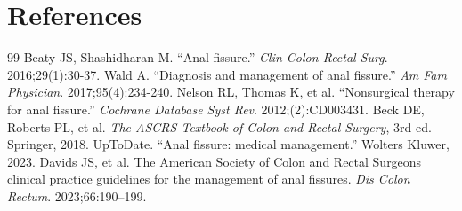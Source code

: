 \section*{References}
\begin{thebibliography}{99}
 Beaty JS, Shashidharan M. ``Anal fissure.'' \textit{Clin Colon Rectal Surg}. 2016;29(1):30-37.
 Wald A. ``Diagnosis and management of anal fissure.'' \textit{Am Fam Physician}. 2017;95(4):234-240.
 Nelson RL, Thomas K, et al. ``Nonsurgical therapy for anal fissure.'' \textit{Cochrane Database Syst Rev}. 2012;(2):CD003431.
 Beck DE, Roberts PL, et al. \textit{The ASCRS Textbook of Colon and Rectal Surgery}, 3rd ed. Springer, 2018.
 UpToDate. ``Anal fissure: medical management.'' Wolters Kluwer, 2023.
 Davids JS, et al. The American Society of Colon and Rectal Surgeons clinical practice guidelines for the management of anal fissures. \textit{Dis Colon Rectum}. 2023;66:190--199.
\end{thebibliography}
